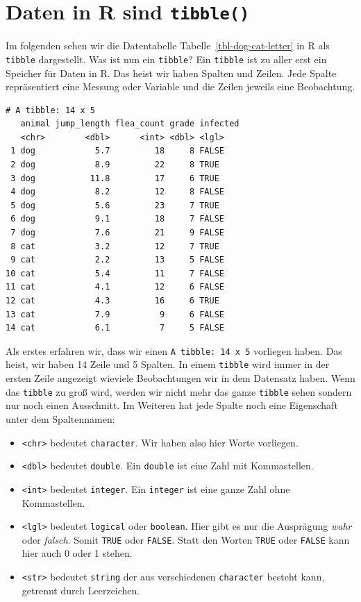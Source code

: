 \documentclass[
  letterpaper,
  DIV=11,
  oneside]{scrreport}
\providecommand{\tightlist}{%
  \setlength{\itemsep}{0pt}\setlength{\parskip}{0pt}}\usepackage{longtable,booktabs,array}
\begin{document}
\hypertarget{daten-in-r-sind-tibble}{%
\section{\texorpdfstring{Daten in R sind
\texttt{tibble()}}{Daten in R sind tibble()}}\label{daten-in-r-sind-tibble}}

Im folgenden sehen wir die Datentabelle Tabelle~\ref{tbl-dog-cat-letter}
in R als \texttt{tibble} dargestellt. Was ist nun ein \texttt{tibble}?
Ein \texttt{tibble} ist zu aller erst ein Speicher für Daten in R. Das
heist wir haben Spalten und Zeilen. Jede Spalte repräsentiert eine
Messung oder Variable und die Zeilen jeweils eine Beobachtung.

\begin{verbatim}
# A tibble: 14 x 5
   animal jump_length flea_count grade infected
   <chr>        <dbl>      <int> <dbl> <lgl>   
 1 dog            5.7         18     8 FALSE   
 2 dog            8.9         22     8 TRUE    
 3 dog           11.8         17     6 TRUE    
 4 dog            8.2         12     8 FALSE   
 5 dog            5.6         23     7 TRUE    
 6 dog            9.1         18     7 FALSE   
 7 dog            7.6         21     9 FALSE   
 8 cat            3.2         12     7 TRUE    
 9 cat            2.2         13     5 FALSE   
10 cat            5.4         11     7 FALSE   
11 cat            4.1         12     6 FALSE   
12 cat            4.3         16     6 TRUE    
13 cat            7.9          9     6 FALSE   
14 cat            6.1          7     5 FALSE   
\end{verbatim}

Als erstes erfahren wir, dass wir einen \texttt{A\ tibble:\ 14\ x\ 5}
vorliegen haben. Das heist, wir haben 14 Zeile und 5 Spalten. In einem
\texttt{tibble} wird immer in der ersten Zeile angezeigt wieviele
Beobachtungen wir in dem Datensatz haben. Wenn das \texttt{tibble} zu
groß wird, werden wir nicht mehr das ganze \texttt{tibble} sehen sondern
nur noch einen Ausschnitt. Im Weiteren hat jede Spalte noch eine
Eigenschaft unter dem Spaltennamen:

\begin{itemize}
\tightlist
\item
  \texttt{\textless{}chr\textgreater{}} bedeutet \texttt{character}. Wir
  haben also hier Worte vorliegen.
\item
  \texttt{\textless{}dbl\textgreater{}} bedeutet \texttt{double}. Ein
  \texttt{double} ist eine Zahl mit Kommastellen.
\item
  \texttt{\textless{}int\textgreater{}} bedeutet \texttt{integer}. Ein
  \texttt{integer} ist eine ganze Zahl ohne Kommastellen.
\item
  \texttt{\textless{}lgl\textgreater{}} bedeutet \texttt{logical} oder
  \texttt{boolean}. Hier gibt es nur die Ausprägung \emph{wahr} oder
  \emph{falsch}. Somit \texttt{TRUE} oder \texttt{FALSE}. Statt den
  Worten \texttt{TRUE} oder \texttt{FALSE} kann hier auch 0 oder 1
  stehen.
\item
  \texttt{\textless{}str\textgreater{}} bedeutet \texttt{string} der aus
  verschiedenen \texttt{character} besteht kann, getrennt durch
  Leerzeichen.
\end{itemize}
\end{document}
